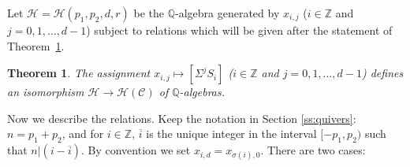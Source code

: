 \documentclass[reqno,12pt,a4paper]{amsart}
\newtheorem{theorem}{Theorem}[section]
\theoremstyle{remark}
\theoremstyle{definition}
\newcommand{\cc}{{\mathcal C}}
\newcommand{\ch}{{\mathcal H}}
\numberwithin{equation}{section}
\begin{document}
Let $\ch=\ch(p_1,p_2,d,r)$ be the $\mathbb{Q}$-algebra generated by $x_{i,j}$ ($i\in\mathbb{Z}$ and $j=0,1,\ldots,d-1$) subject to relations which will be given after the statement of Theorem~\ref{thm-for-zigzag}.

\begin{theorem}\label{thm-for-zigzag}
The assignment $x_{i,j}\mapsto [\Sigma^{j}S_i]$ ($i\in\mathbb{Z}$ and $j=0,1,\ldots,d-1$) defines an isomorphism $\ch\to\ch(\cc)$ of $\mathbb{Q}$-algebras.
\end{theorem}

Now we describe the relations.  Keep the notation in Section \ref{ss:quivers}: $n=p_1+p_2$, and for $i\in \mathbb{Z}$, $\overline{i}$ is the unique integer in the interval $[-p_1,p_2)$ such that $n|(i-\overline{i})$.  By convention we set $x_{i,d}=x_{\sigma(i),0}$. There are two cases:
\end{document}

